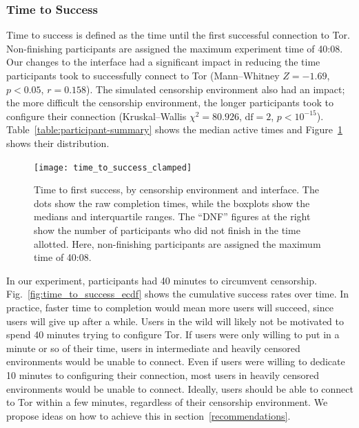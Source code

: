 \documentclass[USenglish,oneside,twocolumn]{article}
\begin{document}
\subsubsection{Time to Success} 
Time to success is defined as the time until the first successful connection to Tor. Non-finishing participants are assigned the maximum experiment time of 40:08.  Our changes to the interface had a significant impact in reducing the time participants took to successfully connect to Tor (Mann--Whitney $ Z = -1.69$, $p < 0.05$, $r= 0.158$). The simulated censorship environment also had an impact; the more difficult the censorship environment, the longer participants took to configure their connection (Kruskal--Wallis $\chi^2 = 80.926$, $\mbox{df} = 2$, $p < 10^{-15}$). 
Table~\ref{table:participant-summary} shows the median active times and Figure~\ref{fig:time_to_success_clamped} shows their distribution.

\begin{figure}[t]
\centering
\texttt{[image: time\_to\_success\_clamped]}
\caption{
Time to first success, by censorship environment and interface.
The dots show the raw completion times,
while the boxplots show the medians and interquartile ranges.
The ``DNF'' figures at the right show the number of participants 
who did not finish in the time allotted.
Here, non-finishing participants are assigned the maximum time of 40:08.
}
\label{fig:time_to_success_clamped}
\end{figure}

In our experiment, participants had 40 minutes to circumvent censorship. Fig.~\ref{fig:time_to_success_ecdf} shows the cumulative success rates over time. In practice, faster time to completion would mean more users will succeed, since users will give up after a while. Users in the wild will likely not be motivated to spend 40 minutes trying to configure Tor. If users were only willing to put in a minute or so of their time, users in intermediate and heavily censored environments would be unable to connect. Even if users were willing to dedicate 10 minutes to configuring their connection, most users in heavily censored environments would be unable to connect. Ideally, users should be able to connect to Tor within a few minutes, regardless of their censorship environment. We propose ideas on how to achieve this in section~\ref{recommendations}. 
\end{document}
